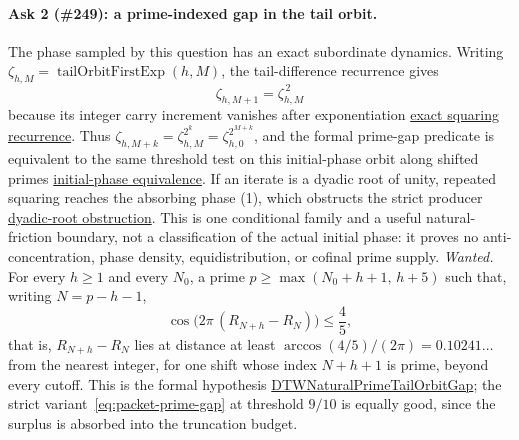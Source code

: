 \documentclass[11pt]{article}
\newcommand{\commit}{99f4bf47422abbd8757cbb22b50ba079d764d3a7}
\newcommand{\repobase}{https://github.com/wcook04/plectis-erdos/blob/\commit}
\newcommand{\rootbase}{https://github.com/wcook04/plectis-erdos/blob/\commit}
\newcommand{\PK}{Erdos249257}
\newcommand{\lword}[4]{\href{\repobase/\PK/#1\#L#2}{#4}}
\newcommand{\rootword}[4]{\href{\rootbase/#1\#L#2}{#4}}
\theoremstyle{definition}
\theoremstyle{remark}
\begin{document}
\paragraph{Ask 2 (\#249): a prime-indexed gap in the tail orbit.}
The phase sampled by this question has an exact subordinate dynamics.  Writing
\(\zeta_{h,M}=\operatorname{tailOrbitFirstExp}(h,M)\), the tail-difference
recurrence gives
\[
  \zeta_{h,M+1}=\zeta_{h,M}^{\,2}
\]
because its integer carry increment vanishes after exponentiation
\rootword{ErdosProblems/Erdos249/TotientStrictPrimeEscape.lean}{167}{tailOrbitFirstExp_succ}{exact squaring recurrence}.
Thus
\(\zeta_{h,M+k}=\zeta_{h,M}^{2^k}=\zeta_{h,0}^{2^{M+k}}\), and the formal
prime-gap predicate is equivalent to the same threshold test on this
initial-phase orbit along shifted primes
\rootword{ErdosProblems/Erdos249/TotientStrictPrimeEscape.lean}{278}{naturalPrimeTailOrbitStrictGap_iff_initial_phase}{initial-phase equivalence}.
If an iterate is a dyadic root of unity, repeated squaring reaches the
absorbing phase (1), which obstructs the strict producer
\rootword{ErdosProblems/Erdos249/TotientStrictPrimeEscape.lean}{322}{not_naturalPrimeTailOrbitStrictGap_of_dyadic_root}{dyadic-root obstruction}.
This is one conditional family and a useful natural-friction boundary, not a
classification of the actual initial phase: it proves no anti-concentration,
phase density, equidistribution, or cofinal prime supply.
\emph{Wanted.}  For every \(h\ge1\) and every \(N_0\), a prime
\(p\ge\max(N_0+h+1,\,h+5)\) such that, writing \(N=p-h-1\),
\[
 \cos\bigl(2\pi\,(R_{N+h}-R_N)\bigr)\le\frac45,
\]
that is, \(R_{N+h}-R_N\) lies at distance at least
\(\arccos(4/5)/(2\pi)=0.10241\ldots\) from the nearest integer, for one shift
whose index \(N+h+1\) is prime, beyond every cutoff.  This is the formal
hypothesis
\lword{PivotAntiReconstruction.lean}{1256}{DTWNaturalPrimeTailOrbitGap}{DTWNaturalPrimeTailOrbitGap};
the strict variant~\eqref{eq:packet-prime-gap} at threshold \(9/10\) is
equally good, since the surplus is absorbed into the truncation budget.
\end{document}

